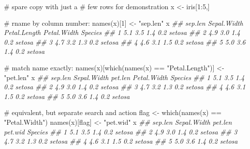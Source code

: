 \documentclass[
  13,
  letterpaper,
]{report}
\newenvironment{Shaded}{\begin{snugshade}}{\end{snugshade}}
\newcommand{\CommentTok}[1]{\textcolor[rgb]{0.37,0.37,0.37}{#1}}
\newcommand{\DecValTok}[1]{\textcolor[rgb]{0.68,0.00,0.00}{#1}}
\newcommand{\DocumentationTok}[1]{\textcolor[rgb]{0.37,0.37,0.37}{\textit{#1}}}
\newcommand{\FunctionTok}[1]{\textcolor[rgb]{0.28,0.35,0.67}{#1}}
\newcommand{\NormalTok}[1]{\textcolor[rgb]{0.00,0.23,0.31}{#1}}
\newcommand{\OtherTok}[1]{\textcolor[rgb]{0.00,0.23,0.31}{#1}}
\newcommand{\SpecialCharTok}[1]{\textcolor[rgb]{0.37,0.37,0.37}{#1}}
\newcommand{\StringTok}[1]{\textcolor[rgb]{0.13,0.47,0.30}{#1}}
\begin{document}
\begin{Shaded}
\begin{Highlighting}[]

\CommentTok{\# spare copy with just a }
\CommentTok{\# few rows for demonstration}
\NormalTok{x }\OtherTok{\textless{}{-}}\NormalTok{ iris[}\DecValTok{1}\SpecialCharTok{:}\DecValTok{5}\NormalTok{,] }

\CommentTok{\# rname by column number:}
\FunctionTok{names}\NormalTok{(x)[}\DecValTok{1}\NormalTok{] }\OtherTok{\textless{}{-}} \StringTok{"sep.len"}
\NormalTok{x}
\DocumentationTok{\#\#   sep.len Sepal.Width Petal.Length Petal.Width Species}
\DocumentationTok{\#\# 1     5.1         3.5          1.4         0.2  setosa}
\DocumentationTok{\#\# 2     4.9         3.0          1.4         0.2  setosa}
\DocumentationTok{\#\# 3     4.7         3.2          1.3         0.2  setosa}
\DocumentationTok{\#\# 4     4.6         3.1          1.5         0.2  setosa}
\DocumentationTok{\#\# 5     5.0         3.6          1.4         0.2  setosa}

\CommentTok{\# match name exactly:}
\FunctionTok{names}\NormalTok{(x)[}\FunctionTok{which}\NormalTok{(}\FunctionTok{names}\NormalTok{(x) }\SpecialCharTok{==} \StringTok{"Petal.Length"}\NormalTok{)] }\OtherTok{\textless{}{-}} \StringTok{"pet.len"}
\NormalTok{x}
\DocumentationTok{\#\#   sep.len Sepal.Width pet.len Petal.Width Species}
\DocumentationTok{\#\# 1     5.1         3.5     1.4         0.2  setosa}
\DocumentationTok{\#\# 2     4.9         3.0     1.4         0.2  setosa}
\DocumentationTok{\#\# 3     4.7         3.2     1.3         0.2  setosa}
\DocumentationTok{\#\# 4     4.6         3.1     1.5         0.2  setosa}
\DocumentationTok{\#\# 5     5.0         3.6     1.4         0.2  setosa}

\CommentTok{\# equivalent, but separate search and action}
\NormalTok{flag }\OtherTok{\textless{}{-}} \FunctionTok{which}\NormalTok{(}\FunctionTok{names}\NormalTok{(x) }\SpecialCharTok{==} \StringTok{"Petal.Width"}\NormalTok{)}
\FunctionTok{names}\NormalTok{(x)[flag] }\OtherTok{\textless{}{-}} \StringTok{"pet.wid"}
\NormalTok{x}
\DocumentationTok{\#\#   sep.len Sepal.Width pet.len pet.wid Species}
\DocumentationTok{\#\# 1     5.1         3.5     1.4     0.2  setosa}
\DocumentationTok{\#\# 2     4.9         3.0     1.4     0.2  setosa}
\DocumentationTok{\#\# 3     4.7         3.2     1.3     0.2  setosa}
\DocumentationTok{\#\# 4     4.6         3.1     1.5     0.2  setosa}
\DocumentationTok{\#\# 5     5.0         3.6     1.4     0.2  setosa}


\end{Highlighting}
\end{Shaded}
\end{document}
